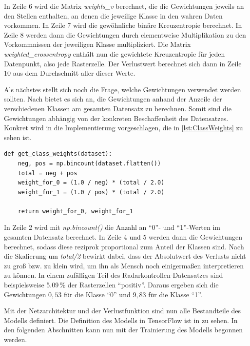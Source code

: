In Zeile 6 wird die Matrix \emph{weights\_v} berechnet, die die Gewichtungen jeweils an den Stellen enthalten, an denen die jeweilige Klasse in den wahren Daten vorkommen.
In Zeile 7 wird die gewöhnliche binäre Kreuzentropie berechnet.
In Zeile 8 werden dann die Gewichtungen durch elementweise Multiplikation zu den Vorkommnissen der jeweiligen Klasse multipliziert.
Die Matrix \emph{weighted\_crossentropy} enthält nun die gewichtete Kreuzentropie für jeden Datenpunkt, also jede Rasterzelle.
Der Verlustwert berechnet sich dann in Zeile 10 aus dem Durchschnitt aller dieser Werte.

Als nächstes stellt sich noch die Frage, welche Gewichtungen verwendet werden sollten.
Nach \cite{KerasImbalancedData} bietet es sich an, die Gewichtungen anhand der Anzeile der verschiedenen Klassen am gesamten Datensatz zu berechnen.
Somit sind die Gewichtungen abhängig von der konkreten Beschaffenheit des Datensatzes.
Konkret wird in \cite{KerasImbalancedData} die Implementierung vorgeschlagen, die in \autoref{lst:ClassWeights} zu sehen ist.

\begin{code}
\begin{verbatim}
def get_class_weights(dataset):
    neg, pos = np.bincount(dataset.flatten())
    total = neg + pos
    weight_for_0 = (1.0 / neg) * (total / 2.0)
    weight_for_1 = (1.0 / pos) * (total / 2.0)

    return weight_for_0, weight_for_1
\end{verbatim}
\label{lst:ClassWeights}
\end{code}

In Zeile 2 wird mit \emph{np.bincount()} die Anzahl an "`0"'- und "`1"'-Werten im gesamten Datensatz berechnet.
In Zeile 4 und 5 werden dann die Gewichtungen berechnet, sodass diese reziprok proportional zum Anteil der Klassen sind.
Nach die Skalierung um \emph{total/2} bewirkt dabei, dass der Absolutwert des Verlusts nicht zu groß bzw. zu klein wird, um ihn als Mensch noch einigermaßen interpretieren zu können.
In einem zufälligen Teil des Radarkontrollen-Datensatzes sind beispielsweise 5.09\,\% der Rasterzellen "`positiv"'.
Daraus ergeben sich die Gewichtungen $0,53$ für die Klasse "`0"' und $9,83$ für die Klasse "`1"'.

Mit der Netzarchitektur und der Verlustfunktion sind nun alle Bestandteile des Modells definiert.
Die Definition des Modells in TensorFlow ist in  zu sehen.
In den folgenden Abschnitten kann nun mit der Trainierung des Modells begonnen werden.
